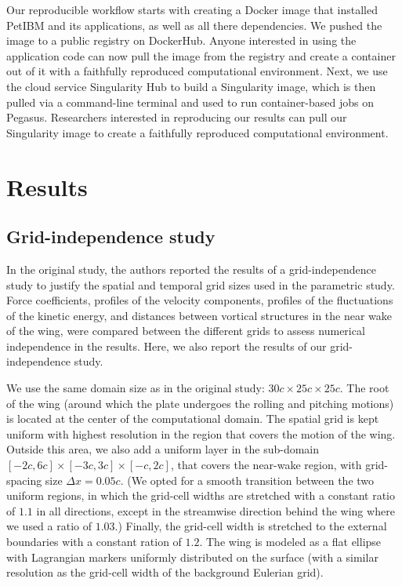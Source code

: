 Our reproducible workflow starts with creating a Docker image that installed PetIBM and its applications, as well as all there dependencies.
We pushed the image to a public registry on DockerHub.
Anyone interested in using the application code can now pull the image from the registry and create a container out of it with a faithfully reproduced computational environment.
Next, we use the cloud service Singularity Hub to build a Singularity image, which is then pulled via a command-line terminal and used to run container-based jobs on Pegasus.
Researchers interested in reproducing our results can pull our Singularity image to create a faithfully reproduced computational environment.

\section{Results}

\subsection{Grid-independence study}

In the original study, the authors reported the results of a grid-independence study to justify the spatial and temporal grid sizes used in the parametric study.
Force coefficients, profiles of the velocity components, profiles of the fluctuations of the kinetic energy, and distances between vortical structures in the near wake of the wing, were compared between the different grids to assess numerical independence in the results.
Here, we also report the results of our grid-independence study.

We use the same domain size as in the original study: $30c \times 25c \times 25c$.
The root of the wing (around which the plate undergoes the rolling and pitching motions) is located at the center of the computational domain.
The spatial grid is kept uniform with highest resolution in the region that covers the motion of the wing.
Outside this area, we also add a uniform layer in the sub-domain $\left[ -2c, 6c \right] \times \left[ -3c, 3c \right] \times \left[ -c, 2c \right]$, that covers the near-wake region, with grid-spacing size $\Delta x = 0.05c$.
(We opted for a smooth transition between the two uniform regions, in which the grid-cell widths are stretched with a constant ratio of $1.1$ in all directions, except in the streamwise direction behind the wing where we used a ratio of $1.03$.)
Finally, the grid-cell width is stretched to the external boundaries with a constant ration of $1.2$.
The wing is modeled as a flat ellipse with Lagrangian markers uniformly distributed on the surface (with a similar resolution as the grid-cell width of the background Eulerian grid).

